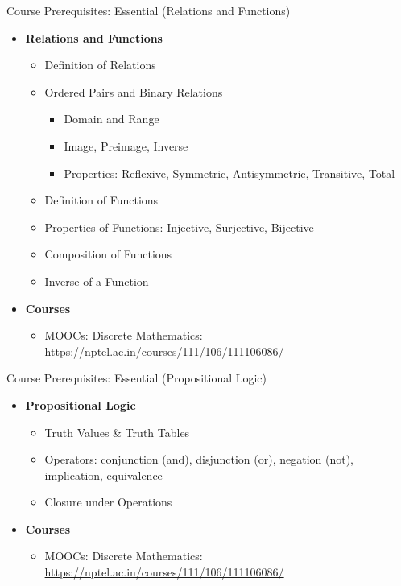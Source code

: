 \documentclass[aspectratio=169, xcolor=dvipsnames]{beamer}
\begin{document}
\begin{frame}{Course Prerequisites: Essential (Relations and Functions)}
    \begin{itemize}[<+->]
        \item \textbf{Relations and Functions}
        \begin{itemize}
            \item Definition of Relations
            \item Ordered Pairs and Binary Relations
            \begin{itemize}
                \item[$\triangleright$] Domain and Range
                \item[$\triangleright$] Image, Preimage, Inverse
                \item[$\triangleright$] Properties: Reflexive, Symmetric, Antisymmetric, Transitive, Total
            \end{itemize}
            \item Definition of Functions
            \item Properties of Functions: Injective, Surjective, Bijective
            \item Composition of Functions
            \item Inverse of a Function
        \end{itemize}
        \item \textbf{Courses}
        \begin{itemize}
            \item[$\triangleright$] MOOCs: Discrete Mathematics: \\
            \url{https://nptel.ac.in/courses/111/106/111106086/}
        \end{itemize}
    \end{itemize}
\end{frame}

\begin{frame}{Course Prerequisites: Essential (Propositional Logic)}
    \begin{itemize}[<+->]
        \item \textbf{Propositional Logic}
        \begin{itemize}
            \item Truth Values \& Truth Tables
            \item Operators: conjunction (and), disjunction (or), negation (not), implication, equivalence
            \item Closure under Operations
        \end{itemize}
        \item \textbf{Courses}
        \begin{itemize}
            \item[$\triangleright$] MOOCs: Discrete Mathematics: \\
            \url{https://nptel.ac.in/courses/111/106/111106086/}
        \end{itemize}
    \end{itemize}
\end{frame}
\end{document}
